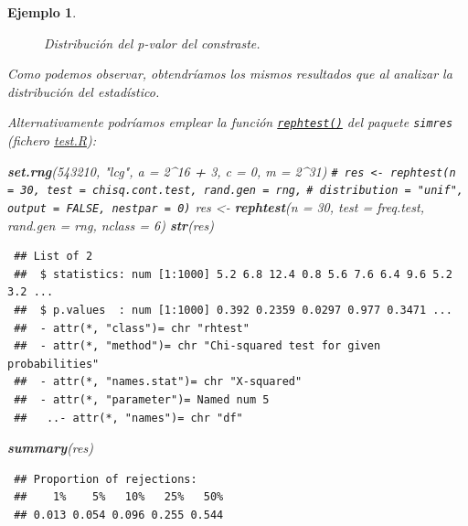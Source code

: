 \documentclass[
  spanish,
  10pt,
]{book}
\newenvironment{Shaded}{\begin{snugshade}}{\end{snugshade}}
\newcommand{\AttributeTok}[1]{\textcolor[rgb]{0.13,0.29,0.53}{#1}}
\newcommand{\CommentTok}[1]{\textcolor[rgb]{0.56,0.35,0.01}{\textit{#1}}}
\newcommand{\DecValTok}[1]{\textcolor[rgb]{0.00,0.00,0.81}{#1}}
\newcommand{\FunctionTok}[1]{\textcolor[rgb]{0.13,0.29,0.53}{\textbf{#1}}}
\newcommand{\NormalTok}[1]{#1}
\newcommand{\OtherTok}[1]{\textcolor[rgb]{0.56,0.35,0.01}{#1}}
\newcommand{\SpecialCharTok}[1]{\textcolor[rgb]{0.81,0.36,0.00}{\textbf{#1}}}
\newcommand{\StringTok}[1]{\textcolor[rgb]{0.31,0.60,0.02}{#1}}
\theoremstyle{break}
\newtheorem{example}{Ejemplo}[chapter]
\theoremstyle{nonumberplain}
\renewcommand{\CommentTok}[1]{\textcolor[rgb]{0.41,0.41,0.41}{\texttt{#1}}}
\begin{document}
\begin{example}
\begin{figure}[!htbp]
{}

\caption{Distribución del p-valor del constraste.}\label{fig:rep-test-pval}
\end{figure}

Como podemos observar, obtendríamos los mismos resultados que al analizar la distribución del estadístico.

Alternativamente podríamos emplear la función \href{https://rubenfcasal.github.io/simres/reference/rephtest.html}{\texttt{rephtest()}} del paquete \texttt{simres} (fichero \href{R/test.R}{\emph{test.R}}):

\begin{Shaded}
\begin{Highlighting}[]
\FunctionTok{set.rng}\NormalTok{(}\DecValTok{543210}\NormalTok{, }\StringTok{"lcg"}\NormalTok{, }\AttributeTok{a =} \DecValTok{2}\SpecialCharTok{\^{}}\DecValTok{16} \SpecialCharTok{+} \DecValTok{3}\NormalTok{, }\AttributeTok{c =} \DecValTok{0}\NormalTok{, }\AttributeTok{m =} \DecValTok{2}\SpecialCharTok{\^{}}\DecValTok{31}\NormalTok{)}
\CommentTok{\# res \textless{}{-} rephtest(n = 30, test = chisq.cont.test, rand.gen = rng,}
\CommentTok{\#          distribution = "unif", output = FALSE, nestpar = 0)}
\NormalTok{res }\OtherTok{\textless{}{-}} \FunctionTok{rephtest}\NormalTok{(}\AttributeTok{n =} \DecValTok{30}\NormalTok{, }\AttributeTok{test =}\NormalTok{ freq.test, }\AttributeTok{rand.gen =}\NormalTok{ rng, }\AttributeTok{nclass =} \DecValTok{6}\NormalTok{)}
\FunctionTok{str}\NormalTok{(res)}
\end{Highlighting}
\end{Shaded}

\begin{verbatim}
 ## List of 2
 ##  $ statistics: num [1:1000] 5.2 6.8 12.4 0.8 5.6 7.6 6.4 9.6 5.2 3.2 ...
 ##  $ p.values  : num [1:1000] 0.392 0.2359 0.0297 0.977 0.3471 ...
 ##  - attr(*, "class")= chr "rhtest"
 ##  - attr(*, "method")= chr "Chi-squared test for given probabilities"
 ##  - attr(*, "names.stat")= chr "X-squared"
 ##  - attr(*, "parameter")= Named num 5
 ##   ..- attr(*, "names")= chr "df"
\end{verbatim}

\begin{Shaded}
\begin{Highlighting}[]
\FunctionTok{summary}\NormalTok{(res)}
\end{Highlighting}
\end{Shaded}

\begin{verbatim}
 ## Proportion of rejections:
 ##    1%    5%   10%   25%   50% 
 ## 0.013 0.054 0.096 0.255 0.544
\end{verbatim}


\end{example}
\end{document}
